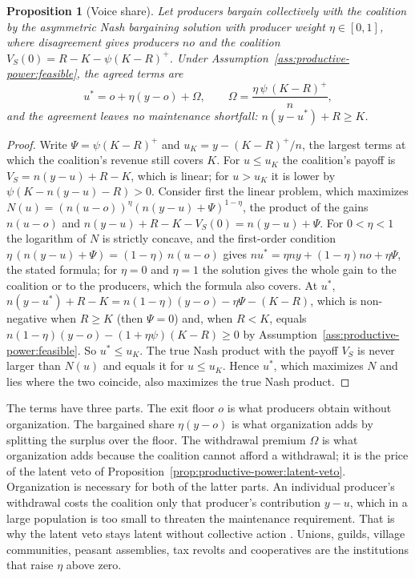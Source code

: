 \documentclass[11pt,letterpaper]{article}
\newtheorem{proposition}[theorem]{Proposition}
\theoremstyle{definition}
\theoremstyle{remark}
\begin{document}
\begin{proposition}[Voice share]
\label{prop:productive-power:voice}
Let producers bargain collectively with the coalition by the asymmetric Nash bargaining solution with producer weight $\eta\in[0,1]$, where disagreement gives producers $no$ and the coalition $V_S(0)=R-K-\psi(K-R)^+$. Under Assumption~\ref{ass:productive-power:feasible}, the agreed terms are
\[
u^*=o+\eta(y-o)+\Omega,\qquad \Omega=\frac{\eta\,\psi\,(K-R)^+}{n},
\]
and the agreement leaves no maintenance shortfall: $n(y-u^*)+R\ge K$.
\end{proposition}

\begin{proof}
Write $\Psi=\psi(K-R)^+$ and $u_K=y-(K-R)^+/n$, the largest terms at which the coalition's revenue still covers $K$. For $u\le u_K$ the coalition's payoff is $V_S=n(y-u)+R-K$, which is linear; for $u>u_K$ it is lower by $\psi(K-n(y-u)-R)>0$. Consider first the linear problem, which maximizes $N(u)=(n(u-o))^{\eta}(n(y-u)+\Psi)^{1-\eta}$, the product of the gains $n(u-o)$ and $n(y-u)+R-K-V_S(0)=n(y-u)+\Psi$. For $0<\eta<1$ the logarithm of $N$ is strictly concave, and the first-order condition $\eta\,(n(y-u)+\Psi)=(1-\eta)\,n(u-o)$ gives $nu^*=\eta ny+(1-\eta)no+\eta\Psi$, the stated formula; for $\eta=0$ and $\eta=1$ the solution gives the whole gain to the coalition or to the producers, which the formula also covers. At $u^*$, $n(y-u^*)+R-K=n(1-\eta)(y-o)-\eta\Psi-(K-R)$, which is non-negative when $R\ge K$ (then $\Psi=0$) and, when $R<K$, equals $n(1-\eta)(y-o)-(1+\eta\psi)(K-R)\ge 0$ by Assumption~\ref{ass:productive-power:feasible}. So $u^*\le u_K$. The true Nash product with the payoff $V_S$ is never larger than $N(u)$ and equals it for $u\le u_K$. Hence $u^*$, which maximizes $N$ and lies where the two coincide, also maximizes the true Nash product.
\end{proof}

The terms have three parts. The exit floor $o$ is what producers obtain without organization. The bargained share $\eta(y-o)$ is what organization adds by splitting the surplus over the floor. The withdrawal premium $\Omega$ is what organization adds because the coalition cannot afford a withdrawal; it is the price of the latent veto of Proposition~\ref{prop:productive-power:latent-veto}. Organization is necessary for both of the latter parts. An individual producer's withdrawal costs the coalition only that producer's contribution $y-u$, which in a large population is too small to threaten the maintenance requirement. That is why the latent veto stays latent without collective action \citep{olson1965}. Unions, guilds, village communities, peasant assemblies, tax revolts and cooperatives are the institutions that raise $\eta$ above zero.
\end{document}
